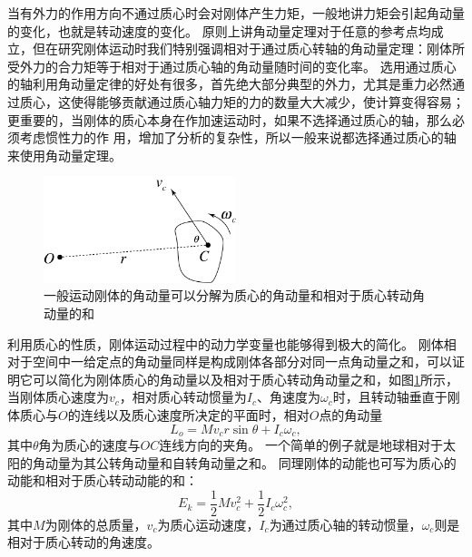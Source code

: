 当有外力的作用方向不通过质心时会对刚体产生力矩，一般地讲力矩会引起角动量的变化，也就是转动速度的变化。
原则上讲角动量定理对于任意的参考点均成立，但在研究刚体运动时我们特别强调相对于通过质心转轴的角动量定理：刚体所受外力的合力矩等于相对于通过质心轴的角动量随时间的变化率。
选用通过质心的轴利用角动量定律的好处有很多，首先绝大部分典型的外力，尤其是重力必然通过质心，这使得能够贡献通过质心轴力矩的力的数量大大减少，使计算变得容易；更重要的，当刚体的质心本身在作加速运动时，如果不选择通过质心的轴，那么必须考虑惯性力的作
用，增加了分析的复杂性，所以一般来说都选择通过质心的轴来使用角动量定理。

\begin{figure}[htbp]
\begin{center}
\includegraphics[width=0.5\textwidth]{images/rb-theory-1.pdf}
\caption{一般运动刚体的角动量可以分解为质心的角动量和相对于质心转动角动量的和}
\label{fig: rb-general-angular-momentum}
\end{center}
\end{figure}


利用质心的性质，刚体运动过程中的动力学变量也能够得到极大的简化。
刚体相对于空间中一给定点的角动量同样是构成刚体各部分对同一点角动量之和，可以证明它可以简化为刚体质心的角动量以及相对于质心转动角动量之和，如图\ref{fig: rb-general-angular-momentum}所示，当刚体质心速度为$v_c$，相对质心转动惯量为$I_c$、角速度为$\omega_c$时，且转动轴垂直于刚体质心与$O$的连线以及质心速度所决定的平面时，相对$O$点的角动量
\begin{equation}\label{eqn: rb-刚体一般动量}
L_o = Mv_cr\sin\theta + I_c\omega_c,
\end{equation}
其中$\theta$角为质心的速度与$OC$连线方向的夹角。
一个简单的例子就是地球相对于太阳的角动量为其公转角动量和自转角动量之和。
同理刚体的动能也可写为质心的动能和相对于质心转动动能的和：
\begin{equation}\label{eqn: rb-刚体一般动能}
E_k = \frac{1}{2}Mv_c^2+ \frac{1}{2}I_c\omega_c^2,
\end{equation}
其中$M$为刚体的总质量，$v_c$为质心运动速度，$I_c$为通过质心轴的转动惯量，$\omega_c$则是相对于质心转动的角速度。

